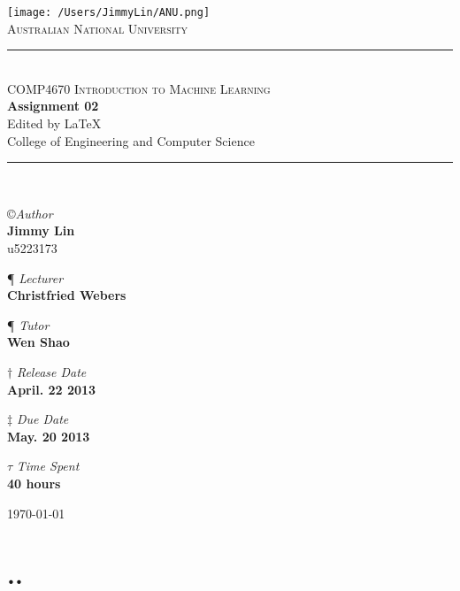 \documentclass[11pt,a4paper]{article}
\newcommand{\AUTHOR}{Jimmy Lin}
\newcommand{\UID}{u5223173}
\newcommand{\UNIVERSITY}{Australian National University}
\newcommand{\COLLEGE}{College of Engineering and Computer Science}
\newcommand{\COURSE}{COMP4670 Introduction to Machine Learning}
\newcommand{\LECTURER}{Christfried Webers}
\newcommand{\TUTOR}{Wen Shao}
\newcommand{\TASK}{Assignment 02}
\newcommand{\RELEASEDATE}{April. 22 2013}
\newcommand{\DUEDATE}{May. 20 2013}
\newcommand{\TIMECONSUME}{40 hours}
\begin{document}
\begin{titlepage}
    \begin{center}
        \vspace*{0.5cm}
\texttt{[image: /Users/JimmyLin/ANU.png]}\\[1cm]
\textsc{\LARGE \UNIVERSITY}\\[1.2cm]

\rule{\linewidth}{0.5mm} \\[0.4cm]
{ \textsc{\Large \COURSE}\\[0.5cm]
 \huge \bfseries \TASK}\\[0.4cm]
 \footnotesize Edited by \LaTeX \\[0.25cm]
 \normalsize{\COLLEGE}
\rule{\linewidth}{0.5mm} \\[2cm]

\begin{center}
\copyright \emph{\large Author} \\
\Large \textbf{\AUTHOR} \\ \UID \vspace*{0.6cm}

\P \emph{ Lecturer} \\
\Large \textbf{\LECTURER} \vspace*{0.6cm}

\P \emph{ Tutor} \\
\Large \textbf{\TUTOR} \vspace*{0.6cm}

$\dagger$ \emph{Release Date}  \\
\Large \textbf{\RELEASEDATE} \vspace*{0.6cm} 

$\ddagger$ \emph{Due Date}  \\
\Large \textbf{\DUEDATE} \vspace*{0.6cm}

$\tau$ \emph{Time Spent} \\
\Large \textbf{\TIMECONSUME} \vspace*{0.6cm} 
\end{center}
\vfill
{\large \today}
\end{center}
\end{titlepage}

\begin{center} \tableofcontents \end{center}
 \newpage
\section{..}
\end{document}
